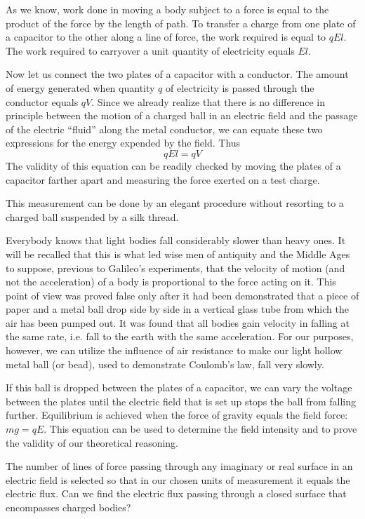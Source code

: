 As we know, work done in moving a body subject to a force is equal to the product of the force by the length of path. To transfer a charge from one plate of a capacitor to the other along a line of force, the work required is equal to $qEl$. The work required to carryover a unit quantity of electricity equals $El$.

Now let us connect the two plates of a capacitor with a conductor. The amount of energy generated when quantity $q$ of electricity is passed through the conductor equals $qV$. Since we already realize that there is no difference in principle between the motion of a charged ball in an electric field and the passage of the electric ``fluid'' along the metal conductor, we can equate these two expressions for the energy expended by the field. Thus
\begin{equation*}%
qEl = qV
\label{energy-field}
\end{equation*}
The validity of this equation can be readily checked by moving the plates of a capacitor farther apart and measuring the force exerted on a test charge.

This measurement can be done by an elegant procedure without resorting to a charged ball suspended by a silk thread.

Everybody knows that light bodies fall considerably slower than heavy ones. It will be recalled that this is what led wise men of antiquity and the Middle Ages to suppose, previous to Galileo's experiments, that the velocity of motion (and not the acceleration) of a body is proportional to the force acting on it. This point of view was proved false only after it had been demonstrated that a piece of paper and a metal ball drop side by side in a vertical glass tube from which the air has been pumped out. It was found that all bodies gain velocity in falling at the same rate, i.e. fall to the earth with the same acceleration. For our purposes, however, we can utilize the influence of air resistance to make our light hollow metal ball (or bead), used to demonstrate Coulomb's law, fall very slowly.

If this ball is dropped between the plates of a capacitor, we can vary the voltage between the plates until the electric field that is set up stops the ball from falling further. Equilibrium is achieved when the force of gravity equals the field force: $mg = qE$. This equation can be used to determine the field intensity and to prove the validity of our theoretical reasoning.

The number of lines of force passing through any imaginary or real surface in an electric field is selected so that in our chosen units of measurement it equals the electric flux. Can we find the electric flux passing through a closed surface that encompasses charged bodies?

